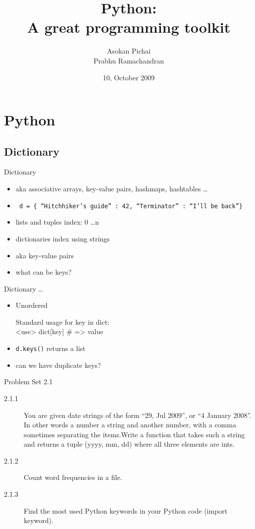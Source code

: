 \documentclass[14pt,compress]{beamer}
\title[Basic Python]{Python:\\A great programming toolkit}
\author[Asokan \& Prabhu] {Asokan Pichai\\Prabhu Ramachandran}
\institute[IIT Bombay] {Department of Aerospace Engineering\\IIT Bombay}
\date[] {10, October 2009}
\newcounter{time}
\newcommand{\inctime}[1]{\addtocounter{time}{#1}{\tiny \thetime\ m}}
\newcommand{\typ}[1]{\texttt{#1}}
\begin{document}
\begin{frame}
  \titlepage
\end{frame}

\section{Python}

\subsection{Dictionary}
\begin{frame}{Dictionary}
  \begin{itemize}
    \item aka associative arrays, key-value pairs, hashmaps, hashtables \ldots    
    \item \typ{ d = \{ ``Hitchhiker's guide'' : 42, ``Terminator'' : ``I'll be back''\}}
    \item lists and tuples index: 0 \ldots n
    \item dictionaries index using strings
    \item aka key-value pairs
    \item what can be keys?
  \end{itemize}
\end{frame}

\begin{frame}{Dictionary \ldots }
  \begin{itemize}
    \item \alert{Unordered}
      \begin{block}{Standard usage}
        for key in dict:\\
            <use> dict[key] \# => value
      \end{block}
    \item \typ{d.keys()} returns a list
    \item can we have duplicate keys?
  \end{itemize}
\end{frame}

\begin{frame} {Problem Set 2.1}
  \begin{description}
\item[2.1.1] You are given date strings of the form ``29, Jul 2009'', or ``4 January 2008''. In other words a number a string and another number, with a comma sometimes separating the items.Write a function that takes such a string and returns a tuple (yyyy, mm, dd) where all three elements are ints.
    \item[2.1.2] Count word frequencies in a file.
    \item[2.1.3] Find the most used Python keywords in your Python code (import keyword).
\end{description}

\inctime{20}
\end{frame}
\end{document}
